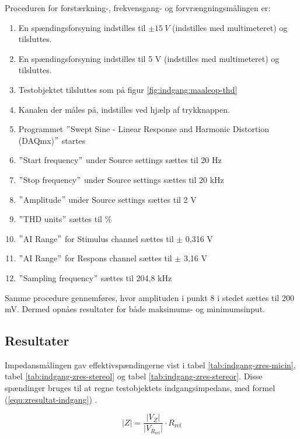 Proceduren for forstærkning-, frekvensgang- og forvrængningsmålingen er:

\begin{enumerate}
\item En spændingsforsyning indstilles til $\pm15~V$ (indstilles med multimeteret) og tilsluttes.
\item En spændingsforsyning indstilles til 5 V (indstilles med multimeteret) og tilsluttes.
\item Testobjektet tilsluttes som på figur \ref{fig:indgang:maaleop-thd}
\item Kanalen der måles på, indstilles ved hjælp af trykknappen.
\item Programmet $"$Swept Sine - Linear Response and Harmonic Distortion (DAQmx)$"$ startes
\item $"$Start frequency$"$ under Source settings sættes til 20 Hz
\item $"$Stop frequency$"$ under Source settings sættes til 20 kHz
\item $"$Amplitude$"$ under Source settings sættes til 2 V
\item $"$THD units$"$ sættes til \%
\item $"$AI Range$"$ for Stimulus channel sættes til $\pm$ 0,316 V
\item $"$AI Range$"$ for Respons channel sættes til $\pm$ 3,16 V
\item $"$Sampling frequency$"$ sættes til 204,8 kHz
\end{enumerate}

Samme procedure gennemføres, hvor amplituden i punkt 8 i stedet sættes til 200 mV. Dermed opnåes resultater for både maksimums- og minimumsinput. 

\subsection*{Resultater}
\label{maalejournal_resultater}

Impedansmålingen gav effektivspændingerne vist i tabel \ref{tab:indgang-zres-micin}, tabel \ref{tab:indgang-zres-stereol} og tabel \ref{tab:indgang-zres-stereor}. Disse spændinger bruges til at regne testobjektets indgangsimpedans, med formel (\ref{equ:zresultat-indgang}) \cite{maaling-mm4}.%

\begin{equation}
\label{equ:zresultat-indgang}
\vert Z \vert = \frac{\vert V_Z \vert}{\vert V_{R_\mathrm{ref}} \vert} \cdot R_\mathrm{ref}
\end{equation} 

